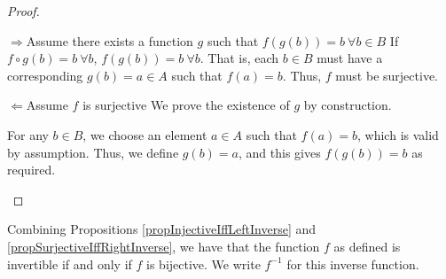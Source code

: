 \documentclass[../Main.tex]{subfiles}
\begin{document}
\begin{proof}
    \begin{proofdirection}{$\Rightarrow$}{Assume there exists a function $g$ such that $f(g(b)) = b~\forall b \in B$}
        If $f \circ g(b) = b~\forall b$, $f(g(b)) = b~\forall b$. That is, each $b \in B$ must have a corresponding $g(b) = a \in A$ such that $f(a) = b$. Thus, $f$ must be surjective.
    \end{proofdirection}
    \begin{proofdirection}{$\Leftarrow$}{Assume $f$ is surjective}
        We prove the existence of $g$ by construction.\par
        For any $b \in B$, we choose an element $a \in A$ such that $f(a) = b$, which is valid by assumption. Thus, we define $g(b) = a$, and this gives $f(g(b)) = b$ as required.
    \end{proofdirection}
\end{proof}
Combining Propositions \ref{propInjectiveIffLeftInverse} and \ref{propSurjectiveIffRightInverse}, we have that the function $f$ as defined is invertible if and only if $f$ is bijective. We write $f^{-1}$ for this inverse function.
\end{document}
